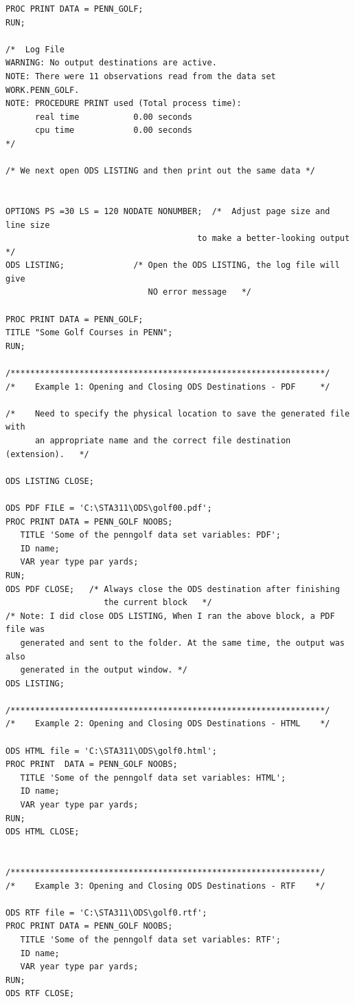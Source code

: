 \documentclass[
]{book}
\begin{document}
\begin{verbatim}
PROC PRINT DATA = PENN_GOLF;
RUN; 

/*  Log File
WARNING: No output destinations are active.
NOTE: There were 11 observations read from the data set WORK.PENN_GOLF.
NOTE: PROCEDURE PRINT used (Total process time):
      real time           0.00 seconds
      cpu time            0.00 seconds
*/

/* We next open ODS LISTING and then print out the same data */


OPTIONS PS =30 LS = 120 NODATE NONUMBER;  /*  Adjust page size and line size 
                                       to make a better-looking output */
ODS LISTING;              /* Open the ODS LISTING, the log file will give 
                             NO error message   */

PROC PRINT DATA = PENN_GOLF;
TITLE "Some Golf Courses in PENN";
RUN; 

/****************************************************************/
/*    Example 1: Opening and Closing ODS Destinations - PDF     */

/*    Need to specify the physical location to save the generated file with 
      an appropriate name and the correct file destination (extension).   */ 

ODS LISTING CLOSE;

ODS PDF FILE = 'C:\STA311\ODS\golf00.pdf';
PROC PRINT DATA = PENN_GOLF NOOBS;
   TITLE 'Some of the penngolf data set variables: PDF';
   ID name;
   VAR year type par yards;
RUN;
ODS PDF CLOSE;   /* Always close the ODS destination after finishing
                    the current block   */
/* Note: I did close ODS LISTING, When I ran the above block, a PDF file was 
   generated and sent to the folder. At the same time, the output was also 
   generated in the output window. */
ODS LISTING;

/****************************************************************/
/*    Example 2: Opening and Closing ODS Destinations - HTML    */

ODS HTML file = 'C:\STA311\ODS\golf0.html';
PROC PRINT  DATA = PENN_GOLF NOOBS;
   TITLE 'Some of the penngolf data set variables: HTML';
   ID name;
   VAR year type par yards;
RUN;
ODS HTML CLOSE;


/***************************************************************/
/*    Example 3: Opening and Closing ODS Destinations - RTF    */

ODS RTF file = 'C:\STA311\ODS\golf0.rtf';
PROC PRINT DATA = PENN_GOLF NOOBS;
   TITLE 'Some of the penngolf data set variables: RTF';
   ID name;
   VAR year type par yards;
RUN;
ODS RTF CLOSE;


\end{verbatim}
\end{document}
